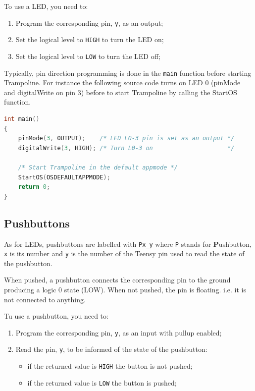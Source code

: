\documentclass[11pt]{report}
\begin{document}
To use a LED, you need to:
\begin{enumerate}
\item Program the corresponding pin, {\tt y}, as an output;
\item Set the logical level to {\tt HIGH} to turn the LED on;
\item Set the logical level to {\tt LOW} to turn the LED off;
\end{enumerate}

Typically, pin direction programming is done in the {\tt main} function before starting Trampoline. For instance the following source code turns on LED 0 (pinMode and digitalWrite on pin 3) before to start Trampoline by calling the StartOS function.

\begin{lstlisting}[language=C]
int main()
{
    pinMode(3, OUTPUT);    /* LED L0-3 pin is set as an output */
    digitalWrite(3, HIGH); /* Turn L0-3 on                     */
    
    /* Start Trampoline in the default appmode */
    StartOS(OSDEFAULTAPPMODE);
    return 0;
}
\end{lstlisting}

\subsection{Pushbuttons}

As for LEDs, pushbuttons are labelled with {\tt Px_y} where {\tt P} stands for {\bf P}ushbutton, {\tt x} is its number and {\tt y} is the number of the Teensy pin used to read the state of the pushbutton. 

When pushed, a pushbutton connects the corresponding pin to the ground producing a logic 0 state (LOW). When not pushed, the pin is floating. i.e. it is not connected to anything.

Tu use a pushbutton, you need to:
\begin{enumerate}
\item Program the corresponding pin, {\tt y}, as an input with pullup enabled;
\item Read the pin, {\tt y}, to be informed of the state of the pushbutton:
    \begin{itemize}
        \item if the returned value is {\tt HIGH} the button is not pushed;
        \item if the returned value is {\tt LOW} the button is pushed;
    \end{itemize}
\end{enumerate}
\end{document}
